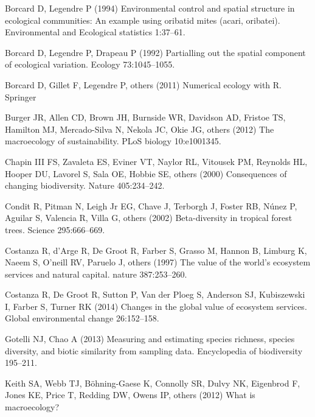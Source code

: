 \documentclass[
  10pt,
]{book}
\newlength{\cslhangindent}
\newenvironment{CSLReferences}[2] %
 {\begin{list}{}{%
  \setlength{\itemindent}{0pt}
  \setlength{\leftmargin}{0pt}
  \setlength{\parsep}{0pt}
  \ifodd #1
   \setlength{\leftmargin}{\cslhangindent}
   \setlength{\itemindent}{-1\cslhangindent}
  \fi
  \setlength{\itemsep}{#2\baselineskip}}}
 {\end{list}}
\begin{document}
\label{refs}
\begin{CSLReferences}{1}{1}
Borcard D, Legendre P (1994) Environmental control and spatial structure
in ecological communities: An example using oribatid mites (acari,
oribatei). Environmental and Ecological statistics 1:37--61.

Borcard D, Legendre P, Drapeau P (1992) Partialling out the spatial
component of ecological variation. Ecology 73:1045--1055.

Borcard D, Gillet F, Legendre P, others (2011) Numerical ecology with
{R}. Springer

Burger JR, Allen CD, Brown JH, Burnside WR, Davidson AD, Fristoe TS,
Hamilton MJ, Mercado-Silva N, Nekola JC, Okie JG, others (2012) The
macroecology of sustainability. PLoS biology 10:e1001345.

Chapin III FS, Zavaleta ES, Eviner VT, Naylor RL, Vitousek PM, Reynolds
HL, Hooper DU, Lavorel S, Sala OE, Hobbie SE, others (2000) Consequences
of changing biodiversity. Nature 405:234--242.

Condit R, Pitman N, Leigh Jr EG, Chave J, Terborgh J, Foster RB, Núnez
P, Aguilar S, Valencia R, Villa G, others (2002) Beta-diversity in
tropical forest trees. Science 295:666--669.

Costanza R, d'Arge R, De Groot R, Farber S, Grasso M, Hannon B, Limburg
K, Naeem S, O'neill RV, Paruelo J, others (1997) The value of the
world's ecosystem services and natural capital. nature 387:253--260.

Costanza R, De Groot R, Sutton P, Van der Ploeg S, Anderson SJ,
Kubiszewski I, Farber S, Turner RK (2014) Changes in the global value of
ecosystem services. Global environmental change 26:152--158.

Gotelli NJ, Chao A (2013) Measuring and estimating species richness,
species diversity, and biotic similarity from sampling data.
Encyclopedia of biodiversity 195--211.

Keith SA, Webb TJ, Böhning-Gaese K, Connolly SR, Dulvy NK, Eigenbrod F,
Jones KE, Price T, Redding DW, Owens IP, others (2012) What is
macroecology?


\end{CSLReferences}
\end{document}
